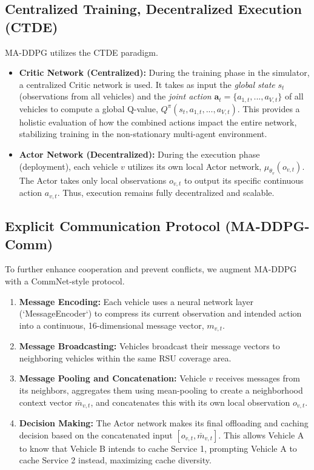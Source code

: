 \documentclass[12pt,a4paper]{report}
\begin{document}
\subsection{Centralized Training, Decentralized Execution (CTDE)}
MA-DDPG utilizes the CTDE paradigm. 
\begin{itemize}
    \item \textbf{Critic Network (Centralized):} During the training phase in the simulator, a centralized Critic network is used. It takes as input the \textit{global state} $s_t$ (observations from all vehicles) and the \textit{joint action} $\boldsymbol{a}_t = \{a_{1,t}, ..., a_{V,t}\}$ of all vehicles to compute a global Q-value, $Q^{\pi}(s_t, a_{1,t}, ..., a_{V,t})$. This provides a holistic evaluation of how the combined actions impact the entire network, stabilizing training in the non-stationary multi-agent environment.
    \item \textbf{Actor Network (Decentralized):} During the execution phase (deployment), each vehicle $v$ utilizes its own local Actor network, $\mu_{\theta_v}(o_{v,t})$. The Actor takes only local observations $o_{v,t}$ to output its specific continuous action $a_{v,t}$. Thus, execution remains fully decentralized and scalable.
\end{itemize}

\subsection{Explicit Communication Protocol (MA-DDPG-Comm)}
To further enhance cooperation and prevent conflicts, we augment MA-DDPG with a CommNet-style protocol.
\begin{enumerate}
    \item \textbf{Message Encoding:} Each vehicle uses a neural network layer (`MessageEncoder`) to compress its current observation and intended action into a continuous, 16-dimensional message vector, $m_{v,t}$.
    \item \textbf{Message Broadcasting:} Vehicles broadcast their message vectors to neighboring vehicles within the same RSU coverage area.
    \item \textbf{Message Pooling and Concatenation:} Vehicle $v$ receives messages from its neighbors, aggregates them using mean-pooling to create a neighborhood context vector $\bar{m}_{v,t}$, and concatenates this with its own local observation $o_{v,t}$.
    \item \textbf{Decision Making:} The Actor network makes its final offloading and caching decision based on the concatenated input $[o_{v,t}, \bar{m}_{v,t}]$. This allows Vehicle A to know that Vehicle B intends to cache Service 1, prompting Vehicle A to cache Service 2 instead, maximizing cache diversity.
\end{enumerate}
\end{document}
